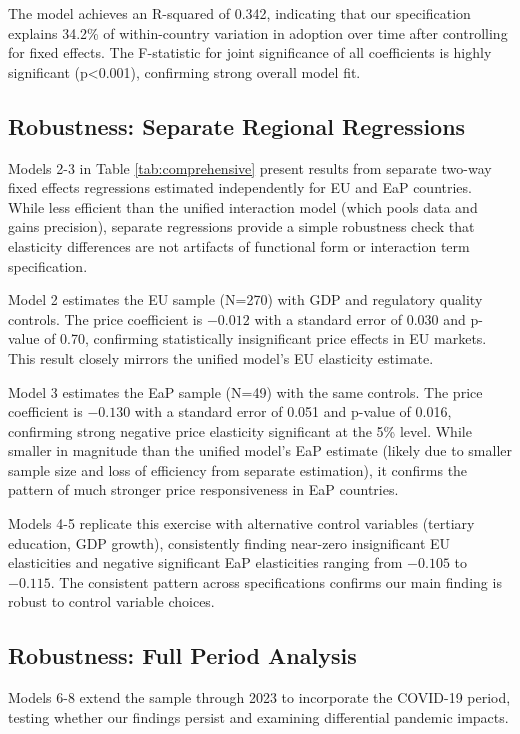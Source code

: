 \documentclass[12pt,review]{elsarticle}
\begin{document}
The model achieves an R-squared of 0.342, indicating that our specification explains 34.2\% of within-country variation in adoption over time after controlling for fixed effects. The F-statistic for joint significance of all coefficients is highly significant (p<0.001), confirming strong overall model fit.

\subsection{Robustness: Separate Regional Regressions}

Models 2-3 in Table \ref{tab:comprehensive} present results from separate two-way fixed effects regressions estimated independently for EU and EaP countries. While less efficient than the unified interaction model (which pools data and gains precision), separate regressions provide a simple robustness check that elasticity differences are not artifacts of functional form or interaction term specification.

Model 2 estimates the EU sample (N=270) with GDP and regulatory quality controls. The price coefficient is $-0.012$ with a standard error of 0.030 and p-value of 0.70, confirming statistically insignificant price effects in EU markets. This result closely mirrors the unified model's EU elasticity estimate.

Model 3 estimates the EaP sample (N=49) with the same controls. The price coefficient is $-0.130$ with a standard error of 0.051 and p-value of 0.016, confirming strong negative price elasticity significant at the 5\% level. While smaller in magnitude than the unified model's EaP estimate (likely due to smaller sample size and loss of efficiency from separate estimation), it confirms the pattern of much stronger price responsiveness in EaP countries.

Models 4-5 replicate this exercise with alternative control variables (tertiary education, GDP growth), consistently finding near-zero insignificant EU elasticities and negative significant EaP elasticities ranging from $-0.105$ to $-0.115$. The consistent pattern across specifications confirms our main finding is robust to control variable choices.

\subsection{Robustness: Full Period Analysis}

Models 6-8 extend the sample through 2023 to incorporate the COVID-19 period, testing whether our findings persist and examining differential pandemic impacts.
\end{document}
